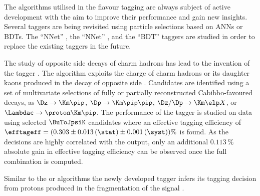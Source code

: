 The algorithms utilised in the flavour tagging are always subject of active
development with the aim to improve their performance and gain new insights.
Several taggers are being revisited using particle selections based on
\acfp{ANN} or \acfp{BDT}. The \enquote{\OSK NNet}
\cite{FT:ANAKaonNNet,FT:KaonNNet}, the \enquote{\SSK NNet}
\cite{FT:ANAKaonNNet,FT:KaonNNet}, and the \enquote{\SSpi BDT} 
taggers are studied in order to replace the existing taggers in the future.

The study of opposite side decays of charm hadrons has lead to the invention of
the \OSc tagger \cite{FT:ANAOSCharm,FT:OSCharm}. The \OSc algorithm exploits the
charge of charm hadrons or its daughter kaons produced in the decay of opposite
side \bhadrons. Candidates are identified using a set of multivariate selections
of fully or partially reconstructed Cabibbo-favoured decays, as \eg
$\Dz\to\Km\pip$, $\Dp\to\Km\pip\pip$, $\Dz/\Dp\to\Km\elp X$, or
$\Lambdac\to\proton\Km\pip$. The performance of the \OSc tagger is studied on
data using selected $\BuToJpsiK$ candidates where an effective tagging
efficiency of $\efftageff = (0.303 \pm 0.013\,(\stat) \pm 0.001\,(\syst))\%$ is
found. As the \OSc decisions are highly correlated with the \OSK output, only an
additional $\SI{0.113}{\percent}$ absolute gain in effective tagging efficiency
can be observed once the full \OS combination is computed.

Similar to the \SSp or \SSK algorithms the newly developed \SSp tagger
 infers its tagging decision from protons produced in the
fragmentation of the signal \Bmeson.
